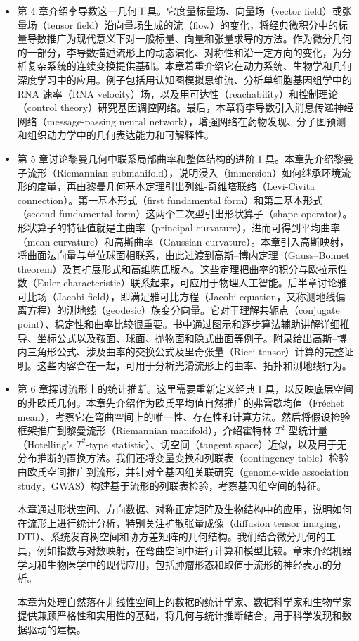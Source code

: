 \begin{itemize}
  \item 第 4 章介绍李导数这一几何工具。它度量标量场、向量场（vector field）或张量场（tensor field）沿向量场生成的流（flow）的变化，将经典微积分中的标量导数推广为现代意义下对一般标量、向量和张量求导的方法。作为微分几何的一部分，李导数描述流形上的动态演化、对称性和沿一定方向的变化，为分析复杂系统的连续变换提供基础。本章着重介绍它在动力系统、生物学和几何深度学习中的应用。例子包括用认知图模拟思维流、分析单细胞基因组学中的 RNA 速率（RNA velocity）场，以及用可达性（reachability）和控制理论（control theory）研究基因调控网络。最后，本章将李导数引入消息传递神经网络（message-passing neural network），增强网络在药物发现、分子图预测和组织动力学中的几何表达能力和可解释性。

  \item 第 5 章讨论黎曼几何中联系局部曲率和整体结构的进阶工具。本章先介绍黎曼子流形（Riemannian submanifold），说明浸入（immersion）如何继承环境流形的度量，再由黎曼几何基本定理引出列维-奇维塔联络（Levi-Civita connection）。第一基本形式（first fundamental form）和第二基本形式（second fundamental form）这两个二次型引出形状算子（shape operator）。形状算子的特征值就是主曲率（principal curvature），进而可得到平均曲率（mean curvature）和高斯曲率（Gaussian curvature）。本章引入高斯映射，将曲面法向量与单位球面相联系，由此过渡到高斯–博内定理（Gauss–Bonnet theorem）及其扩展形式和高维陈氏版本。这些定理把曲率的积分与欧拉示性数（Euler characteristic）联系起来，可应用于物理人工智能。后半章讨论雅可比场（Jacobi field），即满足雅可比方程（Jacobi equation，又称测地线偏离方程）的测地线（geodesic）族变分向量。它对于理解共轭点（conjugate point）、稳定性和曲率比较很重要。书中通过图示和逐步算法辅助讲解详细推导、坐标公式以及鞍面、球面、抛物面和隐式曲面等例子。附录给出高斯–博内三角形公式、涉及曲率的交换公式及里奇张量（Ricci tensor）计算的完整证明。这些内容合在一起，可用于分析光滑流形上的曲率、拓扑和测地线行为。

  \item 第 6 章探讨流形上的统计推断。这里需要重新定义经典工具，以反映底层空间的非欧氏几何。本章先介绍作为欧氏平均值自然推广的弗雷歇均值（Fréchet mean），考察它在弯曲空间上的唯一性、存在性和计算方法。然后将假设检验框架推广到黎曼流形（Riemannian manifold），介绍霍特林 $T^2$ 型统计量（Hotelling's $T^2$-type statistic）、切空间（tangent space）近似，以及用于无分布推断的置换方法。我们还将变量变换和列联表（contingency table）检验由欧氏空间推广到流形，并针对全基因组关联研究（genome-wide association study，GWAS）构建基于流形的列联表检验，考察基因组空间的特征。

  本章通过形状空间、方向数据、对称正定矩阵及生物结构中的应用，说明如何在流形上进行统计分析，特别关注扩散张量成像（diffusion tensor imaging，DTI）、系统发育树空间和协方差矩阵的几何结构。我们结合微分几何的工具，例如指数与对数映射，在弯曲空间中进行计算和模型比较。章末介绍机器学习和生物医学中的现代应用，包括肿瘤形态和取值于流形的神经表示的分析。

  本章为处理自然落在非线性空间上的数据的统计学家、数据科学家和生物学家提供兼顾严格性和实用性的基础，将几何与统计推断结合，用于科学发现和数据驱动的建模。
\end{itemize}

